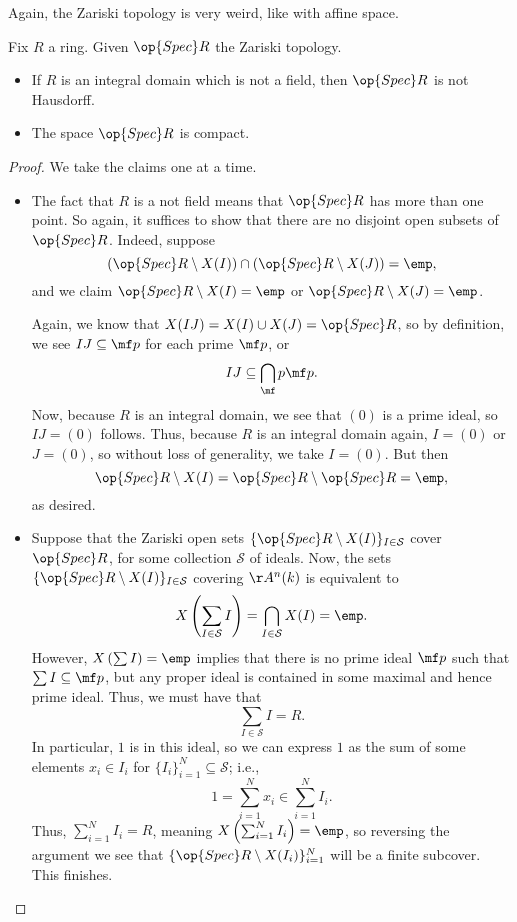 \documentclass[../notes.tex]{subfiles}
\begin{document}
Again, the Zariski topology is very weird, like with affine space.
\begin{proposition}
	Fix $R$ a ring. Given $\op{Spec}R$ the Zariski topology.
	\begin{itemize}
		\item If $R$ is an integral domain which is not a field, then $\op{Spec}R$ is not Hausdorff.
		\item The space $\op{Spec}R$ is compact.
	\end{itemize}
\end{proposition}
\begin{proof}
	We take the claims one at a time.
	\begin{itemize}
		\item The fact that $R$ is a not field means that $\op{Spec}R$ has more than one point. So again, it suffices to show that there are no disjoint open subsets of $\op{Spec}R$. Indeed, suppose
		\[(\op{Spec}R\setminus X(I))\cap(\op{Spec}R\setminus X(J))=\emp,\]
		and we claim $\op{Spec}R\setminus X(I)=\emp$ or $\op{Spec}R\setminus X(J)=\emp$.

		Again, we know that $X(IJ)=X(I)\cup X(J)=\op{Spec}R$, so by definition, we see $IJ\subseteq\mf p$ for each prime $\mf p$, or
		\[IJ\subseteq\bigcap_\mf p\mf p.\]
		Now, because $R$ is an integral domain, we see that $(0)$ is a prime ideal, so $IJ=(0)$ follows. Thus, because $R$ is an integral domain again, $I=(0)$ or $J=(0)$, so without loss of generality, we take $I=(0)$. But then
		\[\op{Spec}R\setminus X(I)=\op{Spec}R\setminus\op{Spec}R=\emp,\]
		as desired.

		\item Suppose that the Zariski open sets $\{\op{Spec}R\setminus X(I)\}_{I\in\mathcal S}$ cover $\op{Spec}R$, for some collection $\mathcal S$ of ideals. Now, the sets $\{\op{Spec}R\setminus X(I)\}_{I\in\mathcal S}$ covering $\AA^n(k)$ is equivalent to
		\[X\left(\sum_{I\in\mathcal S}I\right)=\bigcap_{I\in\mathcal S}X(I)=\emp.\]
		However, $X\left(\sum I\right)=\emp$ implies that there is no prime ideal $\mf p$ such that $\sum I\subseteq\mf p$, but any proper ideal is contained in some maximal and hence prime ideal. Thus, we must have that
		\[\sum_{I\in\mathcal S}I=R.\]
		In particular, $1$ is in this ideal, so we can express $1$ as the sum of some elements $x_i\in I_i$ for $\{I_i\}_{i=1}^N\subseteq\mathcal S$; i.e.,
		\[1=\sum_{i=1}^Nx_i\in\sum_{i=1}^NI_i.\]
		Thus, $\sum_{i=1}^NI_i=R$, meaning $X\left(\sum_{i=1}^NI_i\right)=\emp$, so reversing the argument we see that $\{\op{Spec}R\setminus X(I_i)\}_{i=1}^N$ will be a finite subcover. This finishes.
		\qedhere
	\end{itemize}
\end{proof}
\end{document}
